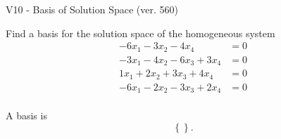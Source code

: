 \begin{exercise}
  \begin{exerciseTitle}V10 - Basis of Solution Space (ver. 560)\end{exerciseTitle}
  \begin{exerciseStatement}
    Find a basis for the solution space of the homogeneous system 
\begin{align*}
 -6 x_ 1 -3 x_ 2 -4 x_ 4 &= 0  \\ 
  -3 x_ 1 -4 x_ 2 -6 x_ 3 + 3 x_ 4 &= 0  \\ 
  1 x_ 1 + 2 x_ 2 + 3 x_ 3 + 4 x_ 4 &= 0  \\ 
  -6 x_ 1 -2 x_ 2 -3 x_ 3 + 2 x_ 4 &= 0  \\ 
 \end{align*}


 
  \end{exerciseStatement}

  \begin{exerciseAnswer}
   A basis is   
\[\left\{\right\}.\]

  


  \end{exerciseAnswer}
\end{exercise}
